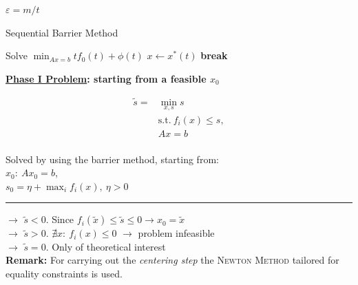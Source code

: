 \documentclass[a4paper]{article}
\begin{document}
\begin{multicols}{2}
    $\varepsilon=m/t$
    \vspace{-0.5cm}
    \begin{algorithm}[H]
        \caption{Sequential Barrier Method}
        \begin{algorithmic}[1]
            \Loop{}
                \State Solve $\min_{Ax=b}{tf_0(t)+\phi(t)}$ 
                \State $x{\gets}x^*(t)$
                  
                    \State \textbf{break}
                \Else  {} 
                \EndIf
            \EndLoop
        \end{algorithmic}
    \end{algorithm}
    \vspace{-0.3cm}
    \noindent
    \textbf{\underline{Phase I Problem}: starting from a feasible $x_0$} 
    \vspace{-0.3cm}
    \begin{multicols}{2}
        \begin{align*}
            \tilde{s}=&\min_{x,s} {s}\\
            &\text{s.t.} \ f_i(x)\le{s}, \\
            &Ax=b
        \end{align*}
        \newcolumn\\
        Solved by using the barrier method, starting from:\\
        $x_0: \ Ax_0=b$,    \\
        $s_0=\eta+\max_{i}{f_i(x)}, \ \eta>0$
    \end{multicols}
    \vspace{-0.8cm}
    \hrule
    \vspace{0.1cm}
    \noindent
    $\to$ $\tilde{s}<0$. Since $f_i(\tilde{x})\le\tilde{s}\le0 \longrightarrow x_0=\tilde{x}$\\
    $\to$ $\tilde{s}>0$. $\nexists{x}: \ f_i(x)\le0$ $\longrightarrow$ problem infeasible\\
    $\to$ $\tilde{s}=0$. Only of theoretical interest\\

    \noindent
    \textbf{Remark:} For carrying out the \textit{centering step} the \textsc{Newton Method} tailored for equality constraints is used.
\end{multicols}
\end{document}
